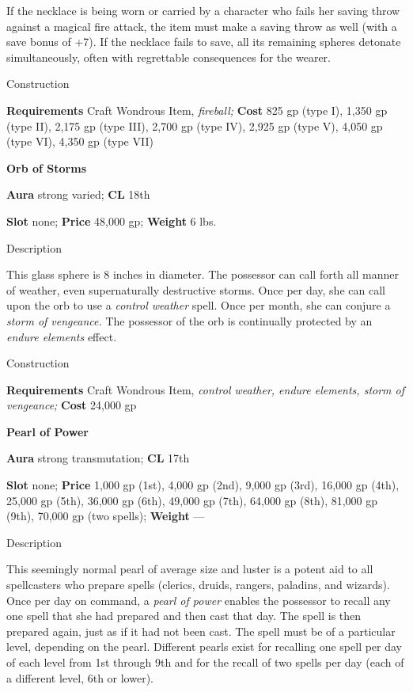 If the necklace is being worn or carried by a character who fails her saving throw against a magical fire attack, the item must make a saving throw as well (with a save bonus of +7). If the necklace fails to save, all its remaining spheres detonate simultaneously, often with regrettable consequences for the wearer. 
				
Construction
				
\textbf{Requirements} Craft Wondrous Item,\textit{ fireball;}\textbf{ Cost }825 gp (type I), 1,350 gp (type II), 2,175 gp (type III), 2,700 gp (type IV), 2,925 gp (type V), 4,050 gp (type VI), 4,350 gp (type VII)
				
\textbf{Orb of Storms}
				
\textbf{Aura} strong varied;\textbf{ CL }18th
				
\textbf{Slot} none; \textbf{Price} 48,000 gp; \textbf{Weight} 6 lbs.
				
Description
				
This glass sphere is 8 inches in diameter. The possessor can call forth all manner of weather, even supernaturally destructive storms. Once per day, she can call upon the orb to use a \textit{control weather} spell. Once per month, she can conjure a \textit{storm of vengeance. }The possessor of the orb is continually protected by an \textit{endure elements} effect. 
				
Construction
				
\textbf{Requirements} Craft Wondrous Item,\textit{ control weather, endure elements, storm of vengeance;}\textbf{ Cost }24,000 gp
				
\textbf{Pearl of Power}
				
\textbf{Aura} strong transmutation;\textbf{ CL }17th
				
\textbf{Slot} none; \textbf{Price} 1,000 gp (1st), 4,000 gp (2nd), 9,000 gp (3rd), 16,000 gp (4th), 25,000 gp (5th), 36,000 gp (6th), 49,000 gp (7th), 64,000 gp (8th), 81,000 gp (9th), 70,000 gp (two spells); \textbf{Weight }---
				
Description
				
This seemingly normal pearl of average size and luster is a potent aid to all spellcasters who prepare spells (clerics, druids, rangers, paladins, and wizards). Once per day on command, a \textit{pearl of power} enables the possessor to recall any one spell that she had prepared and then cast that day. The spell is then prepared again, just as if it had not been cast. The spell must be of a particular level, depending on the pearl. Different pearls exist for recalling one spell per day of each level from 1st through 9th and for the recall of two spells per day (each of a different level, 6th or lower). 
				

